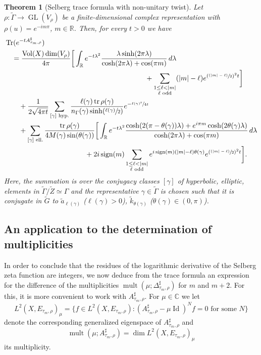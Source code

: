 \documentclass[JEP,XML,SOM,Unicode,NoFloatCountersInSection,published]{cedram}
\newcommand{\psfrac}[2]{\sfrac{(#1)}{#2}}
\theoremstyle{plain}
\newtheorem{theorem}[thm]{Theorem}
\theoremstyle{definition}
\theoremstyle{remark}
\newcommand{\R}{\mathbb{R}}
\newcommand{\C}{\mathbb{C}}
\DeclareMathOperator{\GL}{GL}
\DeclareMathOperator{\Tr}{Tr}
\DeclareMathOperator{\tr}{tr}
\DeclareMathOperator{\Vol}{Vol}
\DeclareMathOperator{\Id}{Id}
\DeclareMathOperator{\sign}{sign}
\numberwithin{equation}{section}
\DeclareMathOperator{\mult}{mult}
\begin{document}
\begin{theorem}[Selberg trace formula with non-unitary twist]\label{thm:TraceFormula}
Let $\rho:\widetilde{\Gamma}\to\GL(V_\rho)$ be a finite-dimensional complex representation with $\rho(u)=e^{-im\pi}$, $m\in\R$. Then, for every $t>0$ we have
\begin{align*}
& \Tr(e^{-tA_{\tau_m,\rho}^\sharp})\\
& \quad=\frac{\Vol(X)\dim(V_\rho)}{4\pi}\bigg[\int_\R e^{-t\lambda^2}\frac{\lambda\sinh(2\pi\lambda)}{\cosh(2\pi\lambda)+\cos(\pi m)}\,d\lambda\\
& \hspace{7cm}+ \sum_{\substack{1\leq\ell<|m|\\\ell\textup{ odd}}}(|m|-\ell)e^{(\psfrac{|m|-\ell}{2})^2t}\bigg]\\
& \qquad+\frac{1}{2\sqrt{4\pi t}}\sum_{[\gamma]\textup{ hyp.}}\frac{\ell(\gamma)\tr\rho(\gamma)}{n_\Gamma(\gamma)\sinh(\sfrac{\ell(\gamma)}{2})}e^{-\sfrac{\ell(\gamma)^2}{4t}}\\
& \qquad+\sum_{[\gamma]\textup{ ell.}} \frac{\tr\rho(\gamma)}{4M(\gamma)\sin(\theta(\gamma))}\bigg[\int_\R e^{-t\lambda^2}\frac{\cosh(2(\pi-\theta(\gamma))\lambda)+e^{i\pi m}\cosh(2\theta(\gamma)\lambda)}{\cosh(2\pi\lambda)+\cos(\pi m)}\,d\lambda\\
& \hspace{4cm}+2i\sign(m)\sum_{\substack{1\leq\ell<|m|\\\ell\textup{ odd}}}e^{i\sign(m)(|m|-\ell)\theta(\gamma)}e^{(\psfrac{|m|-\ell}{2})^2t}\bigg].
\end{align*}
Here, the summation is over the conjugacy classes $[\gamma]$ of hyperbolic, \resp elliptic, elements in $\widetilde{\Gamma}/\widetilde{Z}\simeq\Gamma$ and the representative $\gamma\in\widetilde{\Gamma}$ is chosen such that it is conjugate in $\widetilde{G}$ to $\widetilde{a}_{\ell(\gamma)}$ ($\ell(\gamma)>0$), \resp $\widetilde{k}_{\theta(\gamma)}$ ($\theta(\gamma)\in(0,\pi)$).
\end{theorem}

\subsection{An application to the determination of multiplicities}
\label{subsec:mult}
In order to conclude that the residues of the logarithmic derivative of the Selberg zeta function are integers, we now deduce from the trace formula an expression for the difference of the multiplicities $\mult(\mu;\Delta_{\tau_m,\rho}^\sharp)$ for $m$ and $m+2$. For this, it is more convenient to work with $A_{\tau_m,\rho}^\sharp$. For $\mu\in\C$ we let
\[
L^2(X,E_{\tau_m,\rho})_\mu = \{f\in L^2(X,E_{\tau_m,\rho}):(A_{\tau_m,\rho}^\sharp-\mu\Id)^Nf=0\mbox{ for some }N\}
\]
denote the corresponding generalized eigenspace of $A_{\tau_m,\rho}^\sharp$ and
\[
\mult(\mu;A_{\tau_m,\rho}^\sharp) = \dim L^2(X,E_{\tau_m,\rho})_\mu
\]
its multiplicity.
\end{document}
